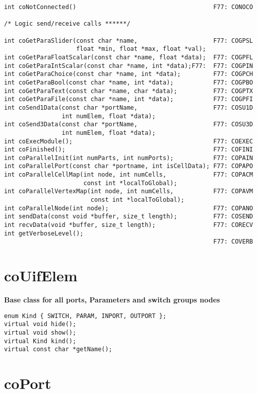 \begin{verbatim}
int coNotConnected()                                      F77: CONOCO

/* Logic send/receive calls ******/
 
int coGetParaSlider(const char *name,                     F77: COGPSL
                    float *min, float *max, float *val);
int coGetParaFloatScalar(const char *name, float *data);  F77: COGPFL
int coGetParaIntScalar(const char *name, int *data);F77:  F77: COGPIN
int coGetParaChoice(const char *name, int *data);         F77: COGPCH
int coGetParaBool(const char *name, int *data);           F77: COGPBO
int coGetParaText(const char *name, char *data);          F77: COGPTX
int coGetParaFile(const char *name, int *data);           F77: COGPFI
int coSend1Data(const char *portName,                     F77: COSU1D
                int numElem, float *data);
int coSend3Data(const char *portName,                     F77: COSU3D
                int numElem, float *data);
int coExecModule();                                       F77: COEXEC
int coFinished();                                         F77: COFINI
int coParallelInit(int numParts, int numPorts);           F77: COPAIN
int coParallelPort(const char *portname, int isCellData); F77: COPAPO
int coParallelCellMap(int node, int numCells,             F77: COPACM
                      const int *localToGlobal);
int coParallelVertexMap(int node, int numCells,           F77: COPAVM
                        const int *localToGlobal);
int coParallelNode(int node);                             F77: COPANO
int sendData(const void *buffer, size_t length);          F77: COSEND 
int recvData(void *buffer, size_t length);                F77: CORECV
int getVerboseLevel();
                                                          F77: COVERB
\end{verbatim}


\section{coUifElem}

{\bf Base class for all ports, Parameters and switch groups nodes}

\begin{verbatim}
enum Kind { SWITCH, PARAM, INPORT, OUTPORT };
virtual void hide();
virtual void show();
virtual Kind kind();
virtual const char *getName();
\end{verbatim}


\section{coPort}

